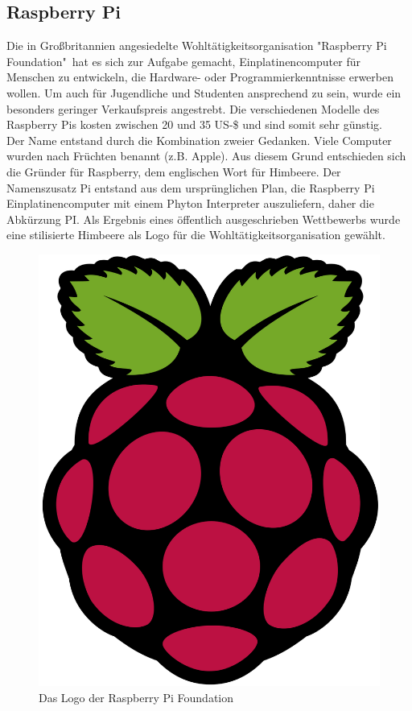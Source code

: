 \subsection{Raspberry Pi}\label{ss:Raspberry}

Die in Großbritannien angesiedelte Wohltätigkeitsorganisation "Raspberry Pi Foundation"\ hat es sich zur Aufgabe gemacht, Einplatinencomputer für Menschen zu entwickeln, die Hardware- oder Programmierkenntnisse erwerben wollen. Um auch für Jugendliche und Studenten ansprechend zu sein, wurde ein besonders geringer Verkaufspreis angestrebt. Die verschiedenen Modelle des Raspberry Pis kosten zwischen 20 und 35 US-\$ und sind somit sehr günstig.\\

Der Name entstand durch die Kombination zweier Gedanken. Viele Computer wurden nach Früchten benannt (z.B. Apple). Aus diesem Grund entschieden sich die Gründer für Raspberry, dem englischen Wort für Himbeere. Der Namenszusatz Pi entstand aus dem ursprünglichen Plan, die Raspberry Pi Einplatinencomputer mit einem Phyton Interpreter auszuliefern, daher die Abkürzung PI. Als Ergebnis eines öffentlich ausgeschrieben Wettbewerbs wurde eine stilisierte Himbeere als Logo für die Wohltätigkeitsorganisation gewählt.

\begin{figure}[H] 
	\centering
	\includegraphics[scale=0.15]{Bilder/raspberrylogo}
	\caption{Das Logo der Raspberry Pi Foundation\cite{i:raspberrylogo}}
	\label{f:raspberrylogo}
\end{figure}


